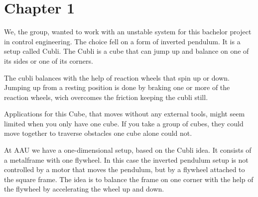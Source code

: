 \chapter{Chapter 1}
We, the group, wanted to work with an unstable system for this bachelor project in control engineering. The choice fell on a form of inverted pendulum. It is a setup called Cubli.
The Cubli is a cube that can jump up and balance on one of its sides or one of its corners.\cite{MGajamohan}

The cubli balances with the help of reaction wheels that spin up or down. Jumping up from a resting position is done by braking one or more of the reaction wheels, wich overcomes the friction keeping the cubli still.

Applications for this Cube, that moves without any external tools, might seem limited when you only have one cube. If you take a group of cubes, they could move together to traverse obstacles one cube alone could not. \cite{JRomanishin}



At AAU we have a one-dimensional setup, based on the Cubli idea. It consists of a metalframe with one flywheel. In this case the inverted pendulum setup is not controlled by a motor that moves the pendulum, but by a flywheel attached to the square frame. The idea is to balance the frame on one corner with the help of the flywheel by accelerating the wheel up and down.



